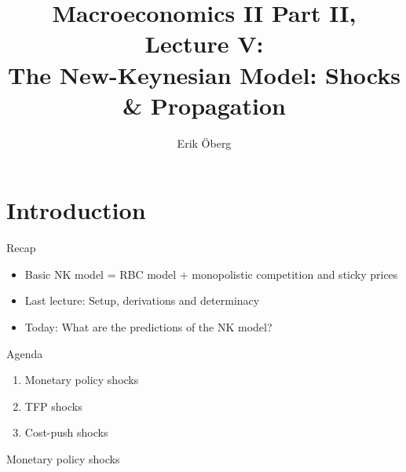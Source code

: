 \documentclass[9pt,xcolor={dvipsnames}]{beamer}
\title[NK: Shocks \& Propagation]{Macroeconomics II Part II, Lecture V:\\
	  The New-Keynesian Model: Shocks \& Propagation}
\author{Erik {\"O}berg}
\date{}
\newcommand{\bit}{\begin{itemize}}
\newcommand{\eit}{\end{itemize}}
\newcommand{\ben}{\begin{enumerate}}
\newcommand{\een}{\end{enumerate}}
\begin{document}
\begin{frame}
\maketitle
\end{frame}

\section{Introduction}


\begin{frame}{Recap}

\bit
\setlength\itemsep{1.5em} 

\item Basic NK model = RBC model + monopolistic competition and sticky prices

\item Last lecture: Setup, derivations and determinacy

\item Today: What are the predictions of the NK model?
\eit

\end{frame}


\begin{frame}{Agenda}

\ben
\setlength\itemsep{1.5em} 

\item Monetary policy shocks

\item TFP shocks

\item Cost-push shocks
\een

\end{frame}


\begin{frame}

\begin{center}
	\huge Monetary policy shocks \normalfont
\end{center}

\end{frame}
\end{document}
